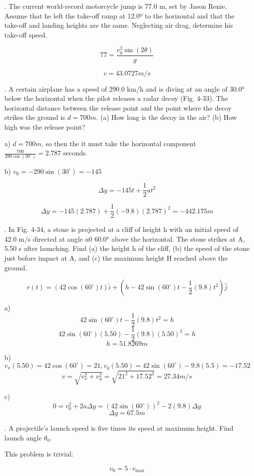 \documentclass{scrreprt} %
\begin{document}
. The current world-record motorcycle jump is 77.0 m,
set  by  Jason  Renie. Assume  that he  left  the  take-off  ramp  at  
12.0º to the horizontal and that the take-off and landing 
heights are the same. Neglecting air drag, determine his take-off
speed.

$$77=\frac{v_0^2\sin(2\theta)}{g}$$

$$\boxed{v = 43.0727 m/s}$$

. A certain airplane has a
speed  of  290.0 km/h  and  is  diving
at  an  angle  of 30.0° below  the
horizontal  when  the pilot  releases
a radar decoy (Fig. 4-33). The horizontal distance between the 
release  point  and  the  point  where
the decoy strikes the ground is $d =
700 m$. (a) How long is the decoy in
the  air?  (b) How high was the release point?

a) $d = 700m$, so then the it must take the horizontal component
$\frac{700}{290\cos(30^\circ)}=\boxed{2.787}$ seconds.

b) $v_0 = -290\sin(30^\circ) = -145$

$$\Delta y = -145t + \frac{1}{2}at^2$$

$$\Delta y = -145(2.787) + \frac{1}{2}(-9.8)(2.787)^2 = \boxed{-442.175 m}$$

. In Fig. 4-34, a stone is projected at a cliff of height h with an initial speed of 42.0 m/s directed
at  angle  u0 60.0° above  the  horizontal. The  stone  strikes  at  A,
5.50 s  after  launching. Find  (a)  the  height  h of  the  cliff, (b)  the
speed of the stone just before impact at A, and (c) the maximum
height H reached above the ground.

$$r(t) = (42\cos(60^\circ)t)\hat{i} + (h - 42\sin(60^\circ)t - \frac{1}{2}(9.8)t^2)\hat{j}$$

a)  $$42\sin(60^\circ)t - \frac{1}{2}(9.8)t^2 = h$$
	$$42\sin(60^\circ)(5.50) - \frac{1}{2}(9.8)(5.50)^2 = h$$
	$$\boxed{h = 51.8269 m}$$

b) 	$$v_x(5.50) = 42\cos(60^\circ) = 21, v_y(5.50) = 42\sin(60^\circ) - 9.8(5.5) = -17.52$$
	$$v = \sqrt{v_x^2 + v_y^2} = \sqrt{21^2 + 17.52^2} = \boxed{27.34 m/s}$$

c) 	$$0 = v_0^2 + 2a\Delta y = (42\sin(60^\circ))^2 - 2(9.8)\Delta y$$
	$$\boxed{\Delta y = 67.5m}$$

. A projectile's launch speed is five times its speed at maximum height.
Find launch angle $\theta_0$.

This problem is trivial:

$$v_0 = 5\cdot v_{\max}$$
\end{document}
